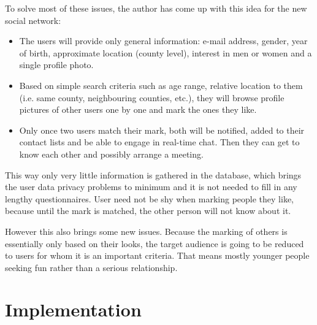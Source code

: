 \documentclass[12pt,oneside]{fithesis}
\begin{document}
	To solve most of these issues, the author has come up with this idea for the new social network:
	\begin{itemize}
		\item The users will provide only general information: e-mail address, gender, year of birth, approximate location (county level), interest in men or women and a single profile photo.
		\item Based on simple search criteria such as age range, relative location to them (i.e. same county, neighbouring counties, etc.), they will browse profile pictures of other users one by one and mark the ones they like.
		\item Only once two users match their mark, both will be notified, added to their contact lists and be able to engage in real-time chat. Then they can get to know each other and possibly arrange a meeting.
	\end{itemize}
	
	This way only very little information is gathered in the database, which brings the user data privacy problems to minimum and it is not needed to fill in any lengthy questionnaires. User need not be shy when marking people they like, because until the mark is matched, the other person will not know about it.
	
	However this also brings some new issues. Because the marking of others is essentially only based on their looks, the target audience is going to be reduced to users for whom it is an important criteria. That means mostly younger people seeking fun rather than a serious relationship.
\chapter{Implementation}
\end{document}
